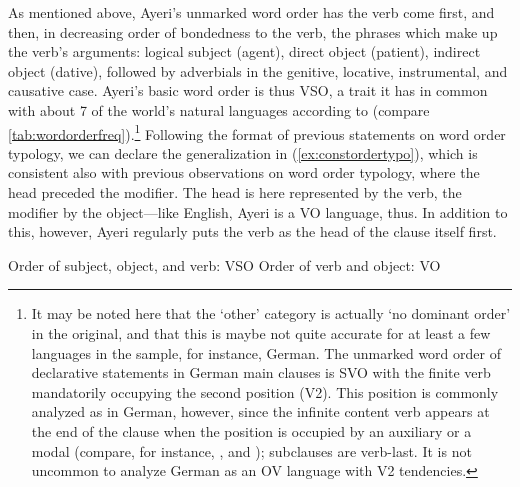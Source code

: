 As mentioned above, Ayeri's unmarked word order has the verb come first, and
then, in decreasing order of bondedness to the verb, the phrases which make up
the verb's arguments: logical subject (agent), direct object (patient),
indirect object (dative), followed by adverbials in the genitive, locative,
instrumental, and causative case. Ayeri's basic word order is thus VSO, a trait
it has in common with about 7\pct{} of the world's natural languages according
to \citet{wals81} (compare \autoref{tab:wordorderfreq}).\footnote{It may be
noted here that the `other' category is actually `no dominant order' in the
original, and that this is maybe not quite accurate for at least a few
languages in the sample, for instance, German. The unmarked word order of
declarative statements in German main clauses is SVO with the finite verb
mandatorily occupying the second position (V2). This position is commonly
analyzed as  in German, however, since the infinite content verb
 appears at the end of the clause when the  position is
occupied by an auxiliary or a modal (compare, for instance, \cite[375--379,
447--450]{bresnan2016}, and \cite{fortmann2006}); subclauses are verb-last. It
is not uncommon to analyze German as an OV language with V2 tendencies.}
Following the format of previous statements on word order typology, we can
declare the generalization in (\ref{ex:constordertypo}), which is consistent
also with previous observations on word order typology, where the head preceded
the modifier. The head is here represented by the verb, the modifier by the
object---like English, Ayeri is a VO language, thus. In addition to this,
however, Ayeri regularly puts the verb as the head of the clause itself first.

\pex\label{ex:constordertypo}
\a Order of subject, object, and verb: VSO
\a Order of verb and object: VO
\xe

